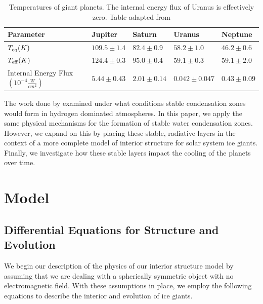 \documentclass[11pt]{ucscthesisbs}
\begin{document}
\renewcommand{\arraystretch}{1.5}
\begin{table}[]
\centering
\begin{tabular}{lllll}
Parameter                                                               & Jupiter                              & Saturn                               & Uranus                                 & Neptune                              \\ \hline
\multicolumn{1}{|l|}{$T_{\rm eq} (K)$}                                  & \multicolumn{1}{l|}{$109.5 \pm 1.4$} & \multicolumn{1}{l|}{$82.4 \pm 0.9$}  & \multicolumn{1}{l|}{$58.2 \pm 1.0$}    & \multicolumn{1}{l|}{$46.2 \pm 0.6$}  \\ \hline
\multicolumn{1}{|l|}{$T_{\rm eff} (K)$}                                 & \multicolumn{1}{l|}{$124.4 \pm 0.3$} & \multicolumn{1}{l|}{$95.0 \pm 0.4$}  & \multicolumn{1}{l|}{$59.1 \pm 0.3$}    & \multicolumn{1}{l|}{$59.1 \pm 2.0$}  \\ \hline
\multicolumn{1}{|l|}{Internal Energy Flux $(10^{-4} \frac{W}{cm^{2}})$} & \multicolumn{1}{l|}{$5.44 \pm 0.43$} & \multicolumn{1}{l|}{$2.01 \pm 0.14$} & \multicolumn{1}{l|}{$0.042 \pm 0.047$} & \multicolumn{1}{l|}{$0.43 \pm 0.09$}  \\ \hline
\end{tabular}
\caption{Temperatures of giant planets. The internal energy flux of Uranus is effectively zero. Table adapted from \citep{pearl_conrath_1991}}
\label{tab:planetary_temperatures}
\end{table}
\renewcommand{\arraystretch}{1}

The work done by \citep{guillot_1995,friedson_2017,leconte_2017} examined under what conditions stable condensation zones would form in hydrogen dominated atmospheres. In this paper, we apply the same physical mechanisms for the formation of stable water condensation zones. However, we expand on this by placing these stable, radiative layers in the context of a more complete model of interior structure for solar system ice giants. Finally, we investigate how these stable layers impact the cooling of the planets over time. 


\chapter{Model}

\section{Differential Equations for Structure and Evolution}
\label{Three-layer Model with Dry Adiabat}
We begin our description of the physics of our interior structure model by assuming that we are dealing with a spherically symmetric object with no electromagnetic field.  With these assumptions in place, we employ the following equations to describe the interior and evolution of ice giants.
\end{document}
